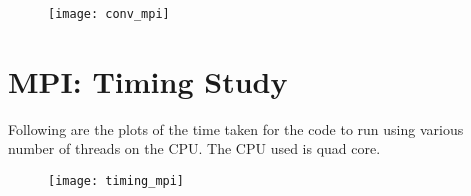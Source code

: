 \documentclass{article}
\begin{document}
\begin{figure}[h!]
\centering
\texttt{[image: conv\_mpi]}
\end{figure}

\section{MPI: Timing Study}

Following are the plots of the time taken for the code to run using various number of threads on the CPU. The CPU used is quad core.

\begin{figure}[h!]
\centering
\texttt{[image: timing\_mpi]}
\end{figure}
\end{document}
